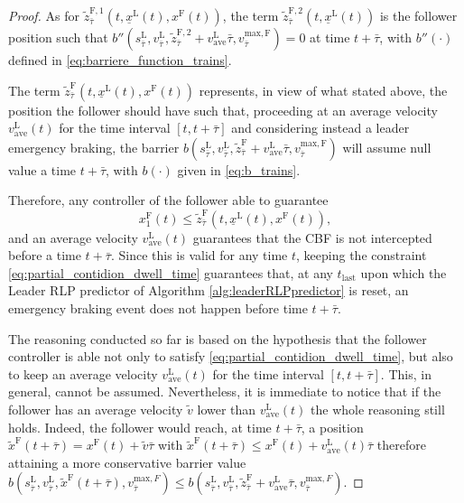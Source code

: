 \begin{proof}
	As for $\tilde{z}^{\mathrm{F},1}_{\bar{\tau}} (t,\underline{x}^\mathrm{L}(t),x^\mathrm{F}(t))$, the term $\tilde{z}^{\mathrm{F},2}_{\bar{\tau}} (t,\underline{x}^\mathrm{L}(t))$ is the follower position such that $b''(s_{\bar{\tau}}^\mathrm{L},v_{\bar{\tau}}^\mathrm{L},\tilde{z}^{\mathrm{F},2}_{\bar{\tau}}+v_{\mathrm{ave}}^\mathrm{L}\bar{\tau},v_{\bar{\tau}}^{\mathrm{max}, \mathrm{F}})=0$ at time $t+\bar{\tau}$, with $b''(\cdot)$ defined in \eqref{eq:barriere_function_trains}.
	
	The term $\tilde{z}^{\mathrm{F}}_{\bar{\tau}} (t,\underline{x}^\mathrm{L}(t),x^\mathrm{F}(t))$ represents, in view of what stated above, the position the follower should have such that, proceeding at an average velocity $v_{\mathrm{ave}}^\mathrm{L}(t)$ for the time interval $[t, t+\bar{\tau}]$ and considering instead a leader emergency braking, the barrier $b(s_{\bar{\tau}}^\mathrm{L},v_{\bar{\tau}}^\mathrm{L},\tilde{z}^{\mathrm{F}}_{\bar{\tau}}+v_{\mathrm{ave}}^\mathrm{L}\bar{\tau},v_{\bar{\tau}}^{\mathrm{max}, \mathrm{F}})$ will assume null value a time $t+\bar{\tau}$, with $b(\cdot)$ given in \eqref{eq:b_trains}.
	
	Therefore, any controller of the follower able to guarantee
	\begin{equation}\label{eq:partial_contidion_dwell_time}
		x_1^\mathrm{F}(t)\leq \tilde{z}^{\mathrm{F}}_{\bar{\tau}} (t,\underline{x}^\mathrm{L}(t),x^\mathrm{F}(t)), 
	\end{equation}
	and an average velocity $v_{\mathrm{ave}}^\mathrm{L}(t)$ guarantees that the CBF is not intercepted before a time $t+\bar{\tau}$. Since this is valid for any time $t$, keeping the constraint \eqref{eq:partial_contidion_dwell_time} guarantees that, at any $t_{\mathrm{last}}$ upon which the Leader RLP predictor of Algorithm \ref{alg:leaderRLPpredictor} is reset, an emergency braking event does not happen before time $t+\bar{\tau}$. 
	
	The reasoning conducted so far is based on the hypothesis that the follower controller is able not only to satisfy \eqref{eq:partial_contidion_dwell_time}, but also to keep an average velocity $v_{\mathrm{ave}}^\mathrm{L}(t)$ for the time interval $[t, t+\bar{\tau}]$. This, in general, cannot be assumed. Nevertheless, it is immediate to notice that if the follower has an average velocity $\tilde{v}$ lower than $v_{\mathrm{ave}}^\mathrm{L}(t)$  the whole reasoning still holds. Indeed, the follower would reach, at time $t+\bar{\tau}$, a position $\tilde{x}^\mathrm{F}(t+\bar{\tau})=x^{\mathrm{F}}(t)+\tilde{v}\bar{\tau}$ with $\tilde{x}^\mathrm{F}(t+\bar{\tau})\leq x^{\mathrm{F}}(t)+v_{\mathrm{ave}}^\mathrm{L}(t)\bar{\tau} $ therefore attaining a more conservative barrier value
	$b(s_{\bar{\tau}}^\mathrm{L},v_{\bar{\tau}}^\mathrm{L},\tilde{x}^\mathrm{F}(t+\bar{\tau}),v_{\bar{\tau}}^{\mathrm{max}, F})\leq b(s_{\bar{\tau}}^\mathrm{L},v_{\bar{\tau}}^\mathrm{L},\tilde{z}^{\mathrm{F}}_{\bar{\tau}}+v_{\mathrm{ave}}^\mathrm{L}\bar{\tau} ,v_{\bar{\tau}}^{\mathrm{max}, F})$.
	

\end{proof}
